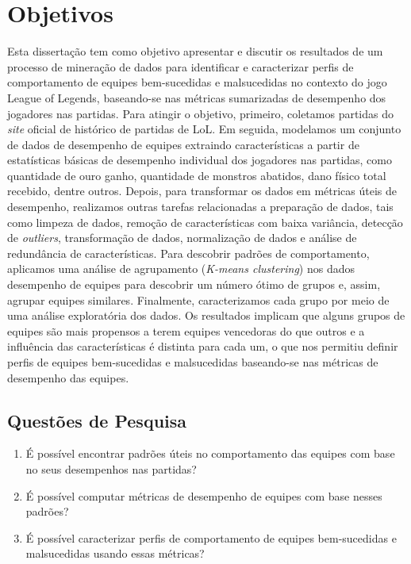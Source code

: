 \section{Objetivos}
Esta dissertação tem como objetivo apresentar e discutir os resultados de um processo de mineração de dados para identificar e caracterizar perfis de comportamento de equipes bem-sucedidas e malsucedidas no contexto do jogo League of Legends, baseando-se nas métricas sumarizadas de desempenho dos jogadores nas partidas. Para atingir o objetivo, primeiro, coletamos partidas do \textit{site} oficial de histórico de partidas de LoL. Em seguida, modelamos um conjunto de dados de desempenho de equipes extraindo características a partir de estatísticas básicas de desempenho individual dos jogadores nas partidas, como quantidade de ouro ganho, quantidade de monstros abatidos, dano físico total recebido, dentre outros. Depois, para transformar os dados em métricas úteis de desempenho, realizamos outras tarefas relacionadas a preparação de dados, tais como limpeza de dados, remoção de características com baixa variância, detecção de \textit{outliers}, transformação de dados, normalização de dados e análise de redundância de características. Para descobrir padrões de comportamento, aplicamos uma análise de agrupamento (\textit{K-means clustering}) nos dados desempenho de equipes para descobrir um número ótimo de grupos e, assim, agrupar equipes similares. Finalmente, caracterizamos cada grupo por meio de uma análise exploratória dos dados. Os resultados implicam que alguns grupos de equipes são mais propensos a terem equipes vencedoras do que outros e a influência das características é distinta para cada um, o que nos permitiu definir perfis de equipes bem-sucedidas e malsucedidas baseando-se nas métricas de desempenho das equipes.

\subsection{Questões de Pesquisa}

\begin{enumerate}[label=(\roman*)]
  \item É possível encontrar padrões úteis no comportamento das equipes com base no seus desempenhos nas partidas?
  \item É possível computar métricas de desempenho de equipes com base nesses padrões?
  \item É possível caracterizar perfis de comportamento de equipes bem-sucedidas e malsucedidas usando essas métricas?
\end{enumerate}


